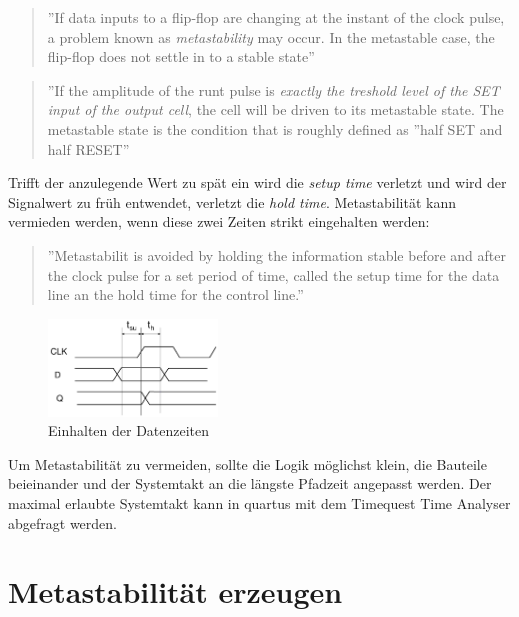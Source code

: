 \begin{quote}
''If data inputs to a flip-flop are changing at the instant of the clock pulse, a problem known as \textit{metastability} may occur. In the metastable case, the flip-flop does not settle in to a stable state'' \cite{ReferenceManual}
\end{quote}

\begin{quote}
''If the amplitude of the runt pulse is \textit{exactly the treshold level of the SET input of the output cell}, the cell will be driven to its metastable state. The metastable state is the condition that is roughly defined as ''half SET and half RESET'' \cite{F_metastability}
\end{quote}

Trifft der anzulegende Wert zu spät ein wird die \textit{setup time} verletzt und wird der Signalwert zu früh entwendet, verletzt die \textit{hold time}. Metastabilität kann vermieden werden, wenn diese zwei Zeiten strikt eingehalten werden:

\begin{quote}
''Metastabilit is avoided by holding the information stable before and after the clock pulse  for a set period of time, called the setup time for the data line an the hold time for the control line.''\cite{ReferenceManual}
\end{quote}

\begin{figure}[H]
	\includegraphics[width=0.4\textwidth]{images/metastability/kritscheZeit_FF.png}
	\caption{Einhalten der Datenzeiten}
	\label{fig.metastabil.kritisches_zeitfenster}
\end{figure}

Um Metastabilität zu vermeiden, sollte die Logik möglichst klein, die Bauteile beieinander und der Systemtakt an die längste Pfadzeit angepasst werden. Der maximal erlaubte Systemtakt kann in quartus mit dem Timequest Time Analyser abgefragt werden.

\section{Metastabilität erzeugen}\label{sect.meatastabil_erzeugen}

